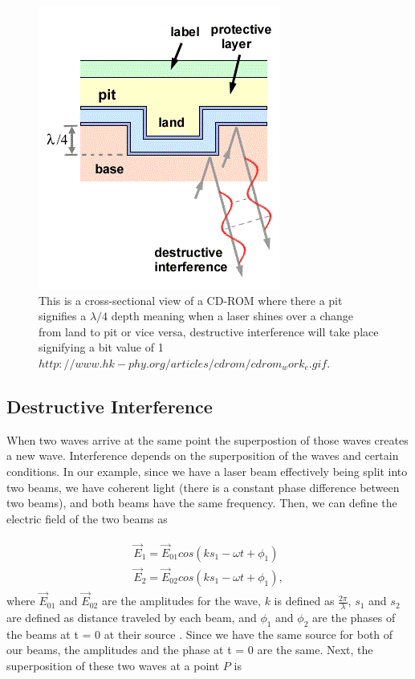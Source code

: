 \documentclass[ notitlepage, numerical, 11pt]{revtex4-1} %
\begin{document}
\begin{figure}[H]
\centerline{\includegraphics[scale=.9]{cdRom.png}}
\caption{ This is a cross-sectional view of a CD-ROM where there a pit signifies a $\lambda/4$ depth meaning when a laser shines over a change from land to pit or vice versa, destructive interference will take place signifying a bit value of 1$ http://www.hk-phy.org/articles/cdrom/cdrom_work_e.gif.$}
\label{cdRom}
\end{figure}

\subsection{Destructive Interference}
When two waves arrive at the same point the superpostion of those waves creates a new wave. Interference depends on the superposition of the waves and certain conditions. In our example, since we have a laser beam effectively being split into two beams, we have coherent light (there is a constant phase difference between two beams), and both beams have the same frequency. Then, we can define the electric field of the two beams as


\begin{align}
\begin{split}
\vec{E}_{1} = \vec{E}_{01} cos(k s_1-\omega t + \phi_1) \\
\vec{E}_{2} = \vec{E}_{02} cos(k s_1-\omega t + \phi_1),
\end{split}
\label{eRefInf}
\end{align}
where $ \vec{E}_{01}$ and $ \vec{E}_{02}$ are the amplitudes for the wave, $k$ is defined as $\frac{2\pi}{\lambda}$, $s_1$ and $s_2$ are defined as distance traveled by each beam, and $\phi_1$ and $\phi_2$ are the phases of the beams at t = 0 at their source \cite{optics}. Since we have the same source for both of our beams, the amplitudes and the phase at t = 0 are the same. Next, the superposition of these two waves at a point $P$ is 
\end{document}
